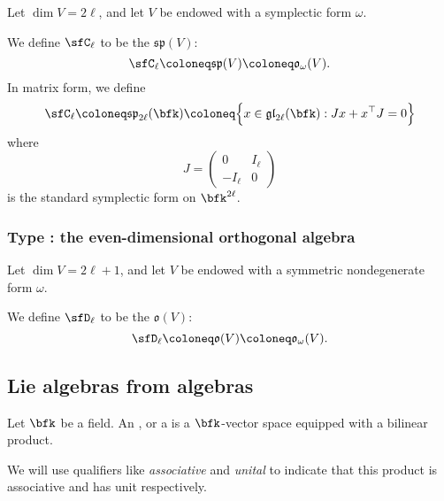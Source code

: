 \documentclass{article}
\newcommand*\glalg{\ensuremath{\mathfrak{gl}}}
\newcommand*\spalg{\ensuremath{\mathfrak{sp}}}
\newcommand*\oalg{\ensuremath{\mathfrak{o}}}
\begin{document}
\begin{definition}
    Let $\dim V = 2\ell$, and let $V$ be endowed with a symplectic form $\omega$.

    We define $\sfC_\ell$ to be the  $\spalg(V)$:
    \[
        \sfC_\ell
        \coloneq
        \spalg(V)
        \coloneq
        \oalg_\omega(V).
    \]
    In matrix form, we define
    \[
        \sfC_\ell
        \coloneq
        \spalg_{2\ell}(\bfk)
        \coloneq
        \Big\{
            x \in \glalg_{2\ell}(\bfk)
            :
            Jx + x^\top J = 0
        \Big\}
    \]
    where
    \[
        J
        =
        \begin{pmatrix}
            0 & I_\ell \\
            -I_\ell & 0
        \end{pmatrix}
    \]
    is the standard symplectic form on $\bfk^{2\ell}$.
\end{definition}

\subsubsection{Type \sfD: the even-dimensional orthogonal algebra}

\begin{definition}
    Let $\dim V = 2\ell+1$, and let $V$ be endowed with a symmetric nondegenerate form $\omega$.

    We define $\sfD_\ell$ to be the  $\oalg(V)$:
    \[
        \sfD_\ell
        \coloneq
        \oalg(V)
        \coloneq
        \oalg_\omega(V).
    \]
\end{definition}

\subsection{Lie algebras from algebras}

\begin{definition}
    Let $\bfk$ be a field.
    An , or a  is a $\bfk$-vector space equipped with a bilinear product.

    We will use qualifiers like \textit{associative} and \textit{unital} to indicate that this product is associative and has unit respectively.
\end{definition}
\end{document}
